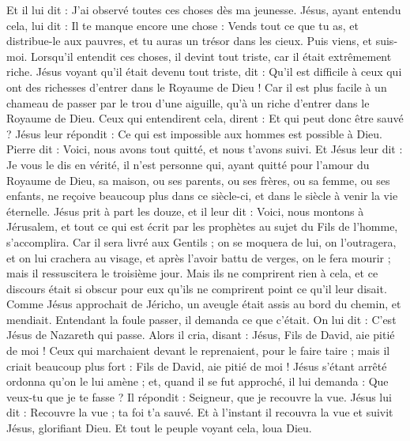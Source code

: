 \begin{multicols}{2}
Et il lui dit : J'ai observé toutes ces choses dès ma jeunesse.
Jésus, ayant entendu cela, lui dit : Il te manque encore une chose : Vends tout ce que tu as, et distribue-le aux pauvres, et tu auras un trésor dans les cieux. Puis viens, et suis-moi.
Lorsqu'il entendit ces choses, il devint tout triste, car il était extrêmement riche.
Jésus voyant qu'il était devenu tout triste, dit : Qu'il est difficile à ceux qui ont des richesses d'entrer dans le Royaume de Dieu !
Car il est plus facile à un chameau de passer par le trou d'une aiguille, qu'à un riche d'entrer dans le Royaume de Dieu.
Ceux qui entendirent cela, dirent : Et qui peut donc être sauvé ?
Jésus leur répondit : Ce qui est impossible aux hommes est possible à Dieu.
Pierre dit : Voici, nous avons tout quitté, et nous t'avons suivi.
Et Jésus leur dit : Je vous le dis en vérité, il n'est personne qui, ayant quitté pour l'amour du Royaume de Dieu, sa maison, ou ses parents, ou ses frères, ou sa femme, ou ses enfants,
ne reçoive beaucoup plus dans ce siècle-ci, et dans le siècle à venir la vie éternelle.
Jésus prit à part les douze, et il leur dit : Voici, nous montons à Jérusalem, et tout ce qui est écrit par les prophètes au sujet du Fils de l'homme, s'accomplira.
Car il sera livré aux Gentils ; on se moquera de lui, on l'outragera, et on lui crachera au visage,
et après l'avoir battu de verges, on le fera mourir ; mais il ressuscitera le troisième jour.
Mais ils ne comprirent rien à cela, et ce discours était si obscur pour eux qu'ils ne comprirent point ce qu'il leur disait.
Comme Jésus approchait de Jéricho, un aveugle était assis au bord du chemin, et mendiait.
Entendant la foule passer, il demanda ce que c'était.
On lui dit : C'est Jésus de Nazareth qui passe.
Alors il cria, disant : Jésus, Fils de David, aie pitié de moi !
Ceux qui marchaient devant le reprenaient, pour le faire taire ; mais il criait beaucoup plus fort : Fils de David, aie pitié de moi !
Jésus s'étant arrêté ordonna qu'on le lui amène ; et, quand il se fut approché,
il lui demanda : Que veux-tu que je te fasse ? Il répondit : Seigneur, que je recouvre la vue.
Jésus lui dit : Recouvre la vue ; ta foi t'a sauvé.
Et à l'instant il recouvra la vue et suivit Jésus, glorifiant Dieu. Et tout le peuple voyant cela, loua Dieu.

\end{multicols}
